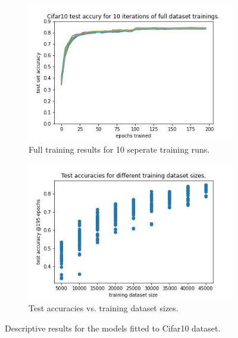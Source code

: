 \documentclass{article} %
\begin{document}
\begin{figure}
    \begin{subfigure}{.5\textwidth}
        \centering
        \includegraphics[width=.8\linewidth]{cifar10/Cifar10_full_dataset_acc_vs_epoch.jpg}
        \caption{Full training results for 10 seperate training runs.}
        \label{fig_full_dataset_epoch_vs_acc_cifar}
    \end{subfigure}%
    \begin{subfigure}{.5\textwidth}
        \centering
        \includegraphics[width=.8\linewidth]{cifar10/Cifar10_training_datasetsize_vs_test_acc.jpg}
        \caption{Test accuracies vs. training dataset sizes.}
        \label{fig_traing_subset_size_vs_test_acc_cifar}
    \end{subfigure}

    \caption{Descriptive results for the models fitted to Cifar10 dataset.}
    \label{fig:desc_plots_cifar10}
\end{figure}
\end{document}
